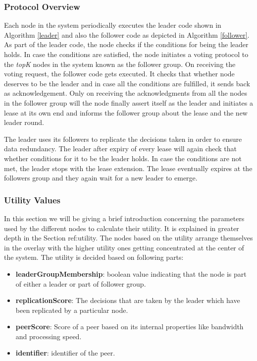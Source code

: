 \documentclass[12pt,a4paper,twoside,openright]{book}
\begin{document}
\subsubsection{Protocol Overview}

Each node in the system periodically executes the leader code shown in Algorithm \ref{leader} and also the follower code as depicted in Algorithm \ref{follower}. As part of the leader code, the node checks if the conditions for being the leader holds. In case the conditions are satisfied, the node initiates a voting protocol to the \textit{topK} nodes in the system known as the follower group. On receiving the voting request, the follower code gets executed. It checks that whether node deserves to be the leader and in case all the conditions are fulfilled, it sends back as acknowledgement. Only on receiving the acknowledgments from all the nodes in the follower group will the node finally assert itself as the leader and initiates a lease at its own end and informs the follower group about the lease and the new leader round. 
\par The leader uses its followers to replicate the decisions taken in order to ensure data redundancy. The leader after expiry of every lease will again check that whether conditions for it to be the leader holds. In case the conditions are not met, the leader stops with the lease extension. The lease eventually expires at the followers group and they again wait for a new leader to emerge. 


\subsubsection{Utility Values}


In this section we will be giving a brief introduction concerning the parameters used by the different nodes to calculate their utility. It is explained in greater depth in the Section {ref:utility}. The nodes based on the utility arrange themselves in the overlay with the higher utility ones getting concentrated at the center of the system. The utility is decided based on following parts:

\begin{itemize}

\item \textbf{leaderGroupMembership}: boolean value indicating that the node is part of either a leader or part of follower group.
\item \textbf{replicationScore}: The decisions that are taken by the leader which have been replicated by a particular node.
\item \textbf{peerScore}: Score of a peer based on its internal properties like bandwidth and processing speed.
\item \textbf{identifier}: identifier of the peer.

\end{itemize}
\end{document}
